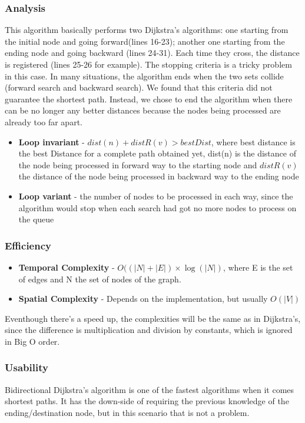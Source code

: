 \subsubsection{Analysis}
This algorithm basically performs two Dijkstra's algorithms: one starting from the initial node and going forward(lines 16-23); another one starting from the ending node and going backward (lines 24-31). Each time they cross, the distance is registered (lines 25-26 for example). The stopping criteria is a tricky problem in this case. In many situations, the algorithm ends when the two sets collide (forward search and backward search). We found that this criteria did not guarantee the shortest path. Instead, we chose to end the algorithm when there can be no longer any better distances because the nodes being processed are already too far apart.
\begin{itemize}
    \item \textbf{Loop invariant} - $ dist(n) + distR(v) > bestDist $, where best distance is the best Distance for a complete path obtained yet, dist(n) is the distance of the node being processed in forward way to the starting node and $ distR(v) $ the distance of the node being processed in backward way to the ending node
    \item \textbf{Loop variant} - the number of nodes to be processed in each way, since the algorithm would stop when each search had got no more nodes to process on the queue
\end{itemize}

\subsubsection{Efficiency}
\begin{itemize}
    \item \textbf{Temporal Complexity} - $ O((|N|+|E|) \times \log(|N|) $, where E is the set of edges and N the set of nodes of the graph.
    \item \textbf{Spatial Complexity} - Depends on the implementation, but usually $ O(|V|) $
\end{itemize}
Eventhough there's a speed up, the complexities will be the same as in Dijkstra's, since the difference is multiplication and division by constants, which is ignored in Big O order.

\subsubsection{Usability}
Bidirectional Dijkstra's algorithm is one of the fastest algorithms when it comes shortest paths. It has the down-side of requiring the previous knowledge of the ending/destination node, but in this scenario that is not a problem.



